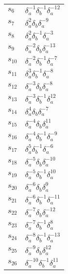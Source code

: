 \documentclass{article}
\begin{document}
\begin{center}
\begin{tabular}{ll}
$s_{6}$ & $\delta_a^{-1}\delta_b^{-1}\delta_a^{-12}$ \\
$s_{7}$ & $\delta_a^{2}\delta_b^{}\delta_a^{-9}$ \\
$s_{8}$ & $\delta_a^{2}\delta_b^{-1}\delta_a^{-3}$ \\
$s_{9}$ & $\delta_a^{-2}\delta_b^{}\delta_a^{-13}$ \\
$s_{10}$ & $\delta_a^{-2}\delta_b^{-1}\delta_a^{-7}$ \\
$s_{11}$ & $\delta_a^{3}\delta_b^{-1}\delta_a^{-8}$ \\
$s_{12}$ & $\delta_a^{-3}\delta_b^{}\delta_a^{-8}$ \\
$s_{13}$ & $\delta_a^{-3}\delta_b^{-1}\delta_a^{12}$ \\
$s_{14}$ & $\delta_a^{4}\delta_b^{}\delta_a^{-7}$ \\
$s_{15}$ & $\delta_a^{-4}\delta_b^{}\delta_a^{11}$ \\
$s_{16}$ & $\delta_a^{-4}\delta_b^{-1}\delta_a^{-9}$ \\
$s_{17}$ & $\delta_a^{5}\delta_b^{-1}\delta_a^{-6}$ \\
$s_{18}$ & $\delta_a^{-5}\delta_b^{}\delta_a^{-10}$ \\
$s_{19}$ & $\delta_a^{-5}\delta_b^{-1}\delta_a^{10}$ \\
$s_{20}$ & $\delta_a^{-6}\delta_b^{}\delta_a^{9}$ \\
$s_{21}$ & $\delta_a^{-6}\delta_b^{-1}\delta_a^{-11}$ \\
$s_{22}$ & $\delta_a^{-7}\delta_b^{}\delta_a^{-12}$ \\
$s_{23}$ & $\delta_a^{-7}\delta_b^{-1}\delta_a^{8}$ \\
$s_{24}$ & $\delta_a^{-8}\delta_b^{-1}\delta_a^{-13}$ \\
$s_{25}$ & $\delta_a^{-9}\delta_b^{}\delta_a^{12}$ \\
$s_{26}$ & $\delta_a^{-10}\delta_b^{-1}\delta_a^{11}$ \\
\bottomrule
\end{tabular}
\end{center}

\thispagestyle{empty}
\end{document}
